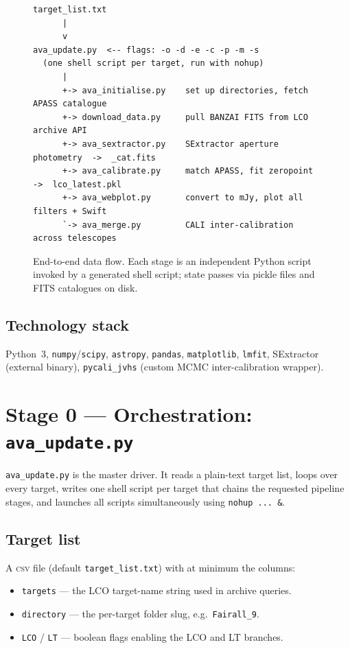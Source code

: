\documentclass[12pt,a4paper]{article}
\begin{document}
\begin{figure}[h!]
\centering
\begin{minipage}{0.85\linewidth}
\begin{lstlisting}[style=shell]
target_list.txt
      |
      v
ava_update.py  <-- flags: -o -d -e -c -p -m -s
  (one shell script per target, run with nohup)
      |
      +-> ava_initialise.py    set up directories, fetch APASS catalogue
      +-> download_data.py     pull BANZAI FITS from LCO archive API
      +-> ava_sextractor.py    SExtractor aperture photometry  ->  _cat.fits
      +-> ava_calibrate.py     match APASS, fit zeropoint  ->  lco_latest.pkl
      +-> ava_webplot.py       convert to mJy, plot all filters + Swift
      `-> ava_merge.py         CALI inter-calibration across telescopes
\end{lstlisting}
\end{minipage}
\caption{End-to-end data flow.  Each stage is an independent Python script
  invoked by a generated shell script; state passes via pickle files and FITS
  catalogues on disk.}
\label{fig:flow}
\end{figure}

\subsection{Technology stack}
Python~3, \texttt{numpy}/\texttt{scipy}, \texttt{astropy}, \texttt{pandas},
\texttt{matplotlib}, \texttt{lmfit}, SExtractor (external binary),
\texttt{pycali\_jvhs} (custom MCMC inter-calibration wrapper).

\section{Stage 0 --- Orchestration: \texttt{ava\_update.py}}
\label{sec:orchestrator}

\texttt{ava\_update.py} is the master driver.  It reads a plain-text target list, loops over
every target, writes one shell script per target that chains the requested pipeline stages,
and launches all scripts simultaneously using \texttt{nohup ... \&}.

\subsection{Target list}

A \textsc{csv} file (default \texttt{target\_list.txt}) with at minimum the columns:
\begin{itemize}[noitemsep]
  \item \texttt{targets} --- the LCO target-name string used in archive queries.
  \item \texttt{directory} --- the per-target folder slug, e.g.\ \texttt{Fairall\_9}.
  \item \texttt{LCO} / \texttt{LT} --- boolean flags enabling the LCO and LT branches.
\end{itemize}
\end{document}
